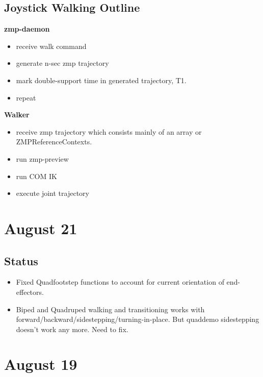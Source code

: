 \documentclass[letterpaper, 10 pt]{report}
\begin{document}
\subsection*{Joystick Walking Outline}
\textbf{zmp-daemon}
\begin{itemize}
    \item receive walk command
    \item generate n-sec zmp trajectory
    \item mark double-support time in generated trajectory, T1. 
    \item repeat
\end{itemize}
\textbf{Walker}
\begin{itemize}
    \item receive zmp trajectory which consists mainly of an array or ZMPReferenceContexts. 
    \item run zmp-preview
    \item run COM IK
    \item execute joint trajectory
\end{itemize}

\section*{August 21}
\subsection*{Status}
\begin{itemize}
\item Fixed Quadfootstep functions to account for current orientation of end-effectors.
\item Biped and Quadruped walking and transitioning works with forward/backward/sidestepping/turning-in-place. But quaddemo sidestepping doesn't work any more. Need to fix.
\end{itemize}

\section*{August 19}
\end{document}
